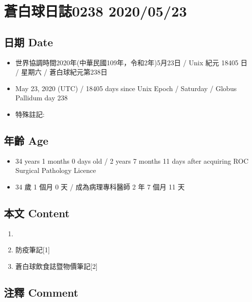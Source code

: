 \documentclass[
]{article}
\providecommand{\tightlist}{%
  \setlength{\itemsep}{0pt}\setlength{\parskip}{0pt}}
\begin{document}
\hypertarget{ux84bcux767dux7403ux65e5ux8a8c0238-20200523}{%
\section{蒼白球日誌0238
2020/05/23}\label{ux84bcux767dux7403ux65e5ux8a8c0238-20200523}}

\hypertarget{ux65e5ux671f-date-22}{%
\subsection{日期 Date}\label{ux65e5ux671f-date-22}}

\begin{itemize}
\tightlist
\item
  世界協調時間2020年(中華民國109年，令和2年)5月23日 / Unix 紀元 18405 日
  / 星期六 / 蒼白球紀元第238日
\item
  May 23, 2020 (UTC) / 18405 days since Unix Epoch / Saturday / Globus
  Pallidum day 238
\item
  特殊註記:
\end{itemize}

\hypertarget{ux5e74ux9f61-age-22}{%
\subsection{年齡 Age}\label{ux5e74ux9f61-age-22}}

\begin{itemize}
\tightlist
\item
  34 years 1 months 0 days old / 2 years 7 months 11 days after
  acquiring ROC Surgical Pathology Licence
\item
  34 歲 1 個月 0 天 / 成為病理專科醫師 2 年 7 個月 11 天
\end{itemize}

\hypertarget{ux672cux6587-content-22}{%
\subsection{本文 Content}\label{ux672cux6587-content-22}}

\begin{enumerate}
\def\labelenumi{\arabic{enumi}.}
\item
\item
  防疫筆記{[}1{]}
\item
  蒼白球飲食誌暨物價筆記{[}2{]}
\end{enumerate}

\hypertarget{ux6ce8ux91cb-comment-22}{%
\subsection{注釋 Comment}\label{ux6ce8ux91cb-comment-22}}
\end{document}
